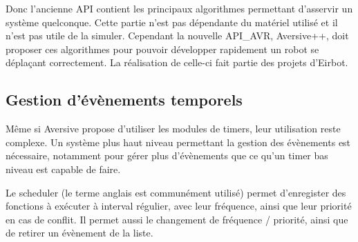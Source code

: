 Donc l'ancienne API contient les principaux algorithmes permettant d'asservir un système quelconque. Cette partie n'est pas dépendante du matériel utilisé et il n'est pas utile de la simuler. 
Cependant la nouvelle API_AVR, Aversive++,  doit proposer ces algorithmes pour pouvoir développer rapidement un robot se déplaçant correctement. La réalisation de celle-ci fait partie des projets d'Eirbot.


\subsection{Gestion d'évènements temporels}

Même si Aversive propose d'utiliser les modules de timers, leur utilisation reste complexe. Un système plus haut niveau permettant la gestion des évènements est nécessaire, notamment pour gérer plus d'évènements que ce qu'un timer bas niveau est capable de faire.

Le scheduler (le terme anglais est communément utilisé) permet d'enregister des fonctions à exécuter à interval régulier, avec leur fréquence, ainsi que leur priorité en cas de conflit. Il permet aussi le changement de fréquence / priorité, ainsi que de retirer un évènement de la liste.
\clearpage